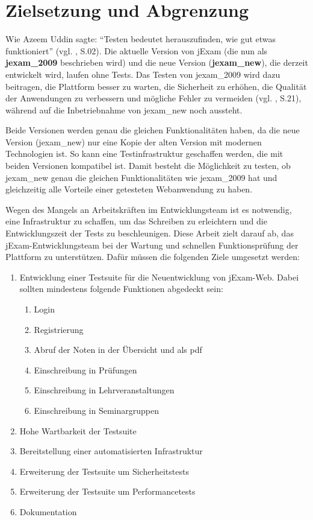 
\section{Zielsetzung und Abgrenzung}


Wie Azeem Uddin  sagte: ``Testen bedeutet herauszufinden, wie gut etwas funktioniert'' (vgl. \cite{anand12importance}, S.02).
Die aktuelle Version von jExam (die nun als \textbf{\gls{jexam_2009}} beschrieben wird) und die neue Version (\textbf{\gls{jexam_new}}),
die derzeit entwickelt wird, laufen ohne Tests. Das Testen von \gls{jexam_2009} wird dazu beitragen, die Plattform
besser zu warten, die Sicherheit zu erhöhen, die Qualität der Anwendungen zu verbessern und mögliche Fehler zu
vermeiden (vgl. \cite{shultz2011software}, S.21), während auf die Inbetriebnahme von \gls{jexam_new} noch aussteht.


Beide Versionen werden genau die gleichen Funktionalitäten haben, da die neue Version (\gls{jexam_new}) nur eine Kopie der
alten Version mit modernen Technologien ist. So kann eine Testinfrastruktur geschaffen werden, die mit beiden Versionen
kompatibel ist. Damit besteht die Möglichkeit zu testen, ob \gls{jexam_new} genau die gleichen Funktionalit\"aten wie
\gls{jexam_2009} hat und gleichzeitig alle Vorteile einer
getesteten Webanwendung zu haben.

Wegen des Mangels an Arbeitskräften im Entwicklungsteam ist es notwendig,
eine Infrastruktur zu schaffen, um das Schreiben zu erleichtern und die
Entwicklungszeit der Tests zu beschleunigen. Diese Arbeit zielt darauf ab,
das jExam-Entwicklungsteam bei der Wartung und schnellen Funktionsprüfung der
Plattform zu unterstützen. Dafür müssen die folgenden Ziele umgesetzt werden:


\begin{enumerate}
    \item Entwicklung einer Testsuite für die Neuentwicklung von jExam-Web.
    Dabei sollten mindestens folgende Funktionen abgedeckt sein:
    \begin{enumerate}
        \item Login
        \item Registrierung
        \item Abruf der Noten in der Übersicht und als pdf
        \item Einschreibung in Prüfungen
        \item Einschreibung in Lehrveranstaltungen
        \item Einschreibung in Seminargruppen
    \end{enumerate}
    \item Hohe Wartbarkeit der Testsuite
    \item Bereitstellung einer automatisierten Infrastruktur
    \item Erweiterung der Testsuite um Sicherheitstests
    \item Erweiterung der Testsuite um Performancetests
    \item Dokumentation
\end{enumerate}